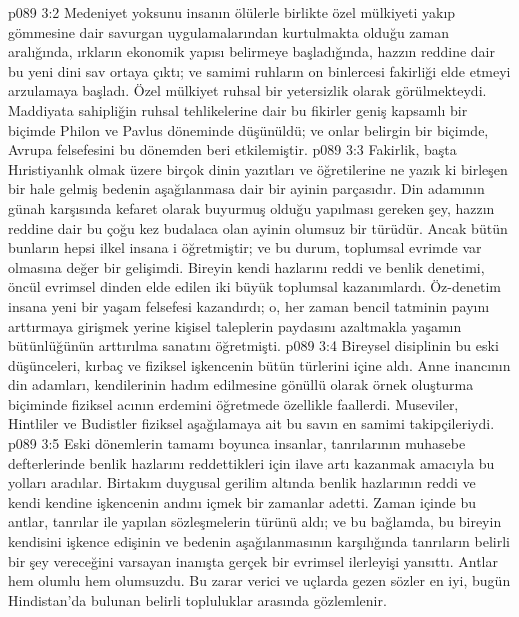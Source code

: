 \vs p089 3:2 Medeniyet yoksunu insanın ölülerle birlikte özel mülkiyeti yakıp gömmesine dair savurgan uygulamalarından kurtulmakta olduğu zaman aralığında, ırkların ekonomik yapısı belirmeye başladığında, hazzın reddine dair bu yeni dini sav ortaya çıktı; ve samimi ruhların on binlercesi fakirliği elde etmeyi arzulamaya başladı. Özel mülkiyet ruhsal bir yetersizlik olarak görülmekteydi. Maddiyata sahipliğin ruhsal tehlikelerine dair bu fikirler geniş kapsamlı bir biçimde Philon ve Pavlus döneminde düşünüldü; ve onlar belirgin bir biçimde, Avrupa felsefesini bu dönemden beri etkilemiştir.
\vs p089 3:3 Fakirlik, başta Hıristiyanlık olmak üzere birçok dinin yazıtları ve öğretilerine ne yazık ki birleşen bir hale gelmiş bedenin aşağılanmasa dair bir ayinin parçasıdır. Din adamının günah karşısında kefaret olarak buyurmuş olduğu yapılması gereken şey, hazzın reddine dair bu çoğu kez budalaca olan ayinin olumsuz bir türüdür. Ancak bütün bunların hepsi ilkel insana i öğretmiştir; ve bu durum, toplumsal evrimde var olmasına değer bir gelişimdi. Bireyin kendi hazlarını reddi ve benlik denetimi, öncül evrimsel dinden elde edilen iki büyük toplumsal kazanımlardı. Öz\hyp{}denetim insana yeni bir yaşam felsefesi kazandırdı; o, her zaman bencil tatminin payını arttırmaya girişmek yerine kişisel taleplerin paydasını azaltmakla yaşamın bütünlüğünün arttırılma sanatını öğretmişti.
\vs p089 3:4 Bireysel disiplinin bu eski düşünceleri, kırbaç ve fiziksel işkencenin bütün türlerini içine aldı. Anne inancının din adamları, kendilerinin hadım edilmesine gönüllü olarak örnek oluşturma biçiminde fiziksel acının erdemini öğretmede özellikle faallerdi. Museviler, Hintliler ve Budistler fiziksel aşağılamaya ait bu savın en samimi takipçileriydi.
\vs p089 3:5 Eski dönemlerin tamamı boyunca insanlar, tanrılarının muhasebe defterlerinde benlik hazlarını reddettikleri için ilave artı kazanmak amacıyla bu yolları aradılar. Birtakım duygusal gerilim altında benlik hazlarının reddi ve kendi kendine işkencenin andını içmek bir zamanlar adetti. Zaman içinde bu antlar, tanrılar ile yapılan sözleşmelerin türünü aldı; ve bu bağlamda, bu bireyin kendisini işkence edişinin ve bedenin aşağılanmasının karşılığında tanrıların belirli bir şey vereceğini varsayan inanışta gerçek bir evrimsel ilerleyişi yansıttı. Antlar hem olumlu hem olumsuzdu. Bu zarar verici ve uçlarda gezen sözler en iyi, bugün Hindistan’da bulunan belirli topluluklar arasında gözlemlenir.
